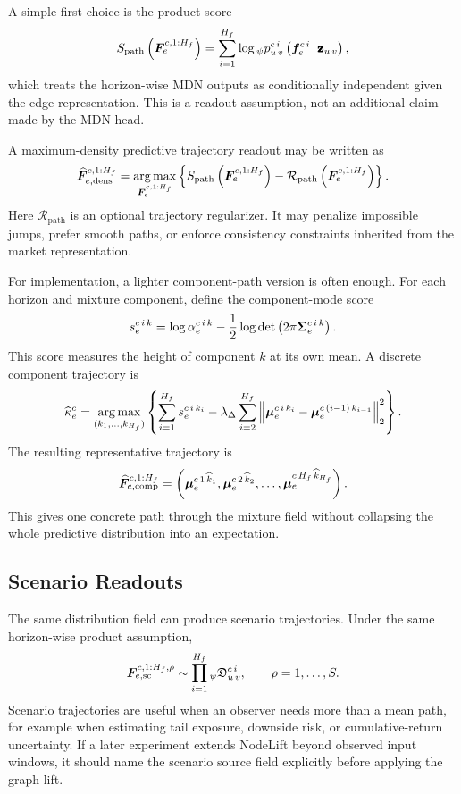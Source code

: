 A simple first choice is the product score
\[
  S_{\mathrm{path}}
  \left(
    \bm{F}_{e}^{c,1:H_f}
  \right)
  =
  \sum_{i=1}^{H_f}
  \log
  {}_{\psi}p_{u\,v}^{c\,i}
  \left(
    \bm{f}_{e}^{c\,i}
    \,\vert\,
    \pmb{\mathbf{z}}_{u\,v}
  \right),
\]
which treats the horizon-wise MDN outputs as conditionally independent given
the edge representation.  This is a readout assumption, not an additional claim
made by the MDN head.

A maximum-density predictive trajectory readout may be written as
\[
  \widehat{\bm{F}}_{e,\mathrm{dens}}^{c,1:H_f}
  =
  \operatorname*{arg\,max}_{\bm{F}_{e}^{c,1:H_f}}
  \left\{
    S_{\mathrm{path}}
    \left(
      \bm{F}_{e}^{c,1:H_f}
    \right)
    -
    \mathcal{R}_{\mathrm{path}}
    \left(
      \bm{F}_{e}^{c,1:H_f}
    \right)
  \right\}.
\]
Here $\mathcal{R}_{\mathrm{path}}$ is an optional trajectory regularizer.  It
may penalize impossible jumps, prefer smooth paths, or enforce consistency
constraints inherited from the market representation.

For implementation, a lighter component-path version is often enough.  For each
horizon and mixture component, define the component-mode score
\[
  s_{e}^{c\,i\,k}
  =
  \log \alpha_{e}^{c\,i\,k}
  -
  \frac{1}{2}
  \log
  \det
  \left(
    2\pi \bm{\Sigma}_{e}^{c\,i\,k}
  \right).
\]
This score measures the height of component $k$ at its own mean.  A discrete
component trajectory is
\[
  \widehat{\kappa}_{e}^{c}
  =
  \operatorname*{arg\,max}_{(k_1,\ldots,k_{H_f})}
  \left\{
    \sum_{i=1}^{H_f}
    s_{e}^{c\,i\,k_i}
    -
    \lambda_{\Delta}
    \sum_{i=2}^{H_f}
    \left\|
      \bm{\mu}_{e}^{c\,i\,k_i}
      -
      \bm{\mu}_{e}^{c\,(i-1)\,k_{i-1}}
    \right\|_2^2
  \right\}.
\]
The resulting representative trajectory is
\[
  \widehat{\bm{F}}_{e,\mathrm{comp}}^{c,1:H_f}
  =
  \left(
    \bm{\mu}_{e}^{c\,1\,\widehat{k}_1},
    \bm{\mu}_{e}^{c\,2\,\widehat{k}_2},
    \ldots,
    \bm{\mu}_{e}^{c\,H_f\,\widehat{k}_{H_f}}
  \right).
\]
This gives one concrete path through the mixture field without collapsing the
whole predictive distribution into an expectation.

\subsection{Scenario Readouts}
\label{subsec:scenario-readouts}

The same distribution field can produce scenario trajectories.  Under the same
horizon-wise product assumption,
\[
  \bm{F}_{e,\mathrm{sc}}^{c,1:H_f,\rho}
  \sim
  \prod_{i=1}^{H_f}
  {}_{\psi}\mathfrak{D}_{u\,v}^{c\,i},
  \qquad
  \rho=1,\ldots,S.
\]
Scenario trajectories are useful when an observer needs more than a mean path,
for example when estimating tail exposure, downside risk, or cumulative-return
uncertainty.  If a later experiment extends NodeLift beyond observed input
windows, it should name the scenario source field explicitly before applying the
graph lift.

